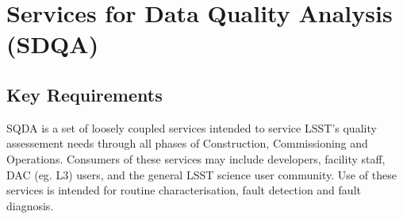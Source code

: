 \section{Services for Data Quality Analysis (SDQA)}
\label{sec:sdqa}

\subsection{Key Requirements}

SQDA is a set of loosely coupled services intended to service LSST's quality assessement needs through all phases of Construction, Commissioning and Operations. Consumers of these services may include developers, facility staff, DAC (eg. L3) users, and the general LSST science user community. Use of these services is intended for routine characterisation, fault detection and fault diagnosis.

